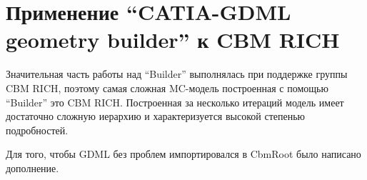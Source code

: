 \section{Применение ``CATIA-GDML geometry builder'' к CBM RICH}\label{sec:RICHgeo}

Значительная часть работы над ``Builder'' выполнялась при поддержке группы CBM RICH, поэтому самая сложная MC-модель построенная с помощью ``Builder'' это CBM RICH. Построенная за несколько итераций модель имеет достаточно сложную иерархию и характеризуется высокой степенью подробностей.

Для того, чтобы GDML без проблем импортировался в CbmRoot было написано дополнение.